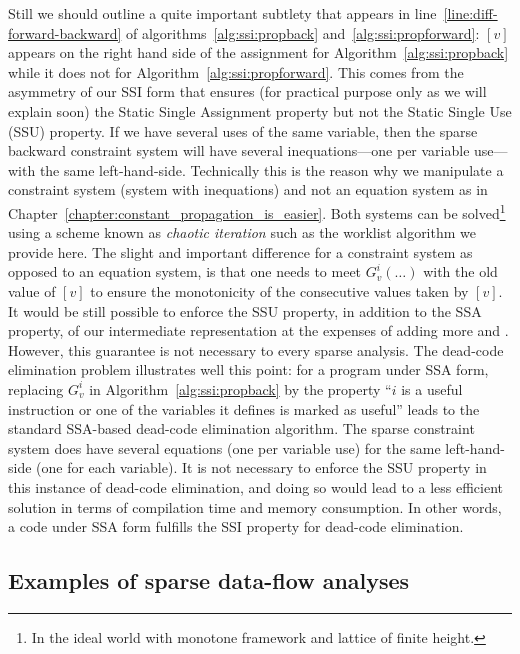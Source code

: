 {Still we should outline a quite important subtlety that appears in 
line~\ref{line:diff-forward-backward} of algorithms~\ref{alg:ssi:propback} 
and~\ref{alg:ssi:propforward}: $[v]$ appears on the right hand side of the 
assignment for Algorithm~\ref{alg:ssi:propback} while it does not for 
Algorithm~\ref{alg:ssi:propforward}. This comes from the asymmetry of our SSI 
form that ensures (for practical purpose only as we will explain soon) the 
Static Single Assignment property but not the Static Single Use (SSU) property.
If we have several uses of the same variable, then the sparse backward 
constraint system will have several inequations---one per variable use---with 
the same left-hand-side.
Technically this is the reason why we manipulate a constraint system (system 
with inequations) and not an equation system as in 
Chapter~\ref{chapter:constant_propagation_is_easier}. Both systems can be 
solved\footnote{In the ideal world with monotone framework and lattice of 
finite height.} using a scheme known as \emph{chaotic iteration} such as the worklist algorithm we provide here. The slight and 
important difference for a constraint system as opposed to an equation system, 
is that one needs to meet $G_v^i(\dots)$ with the old value of $[v]$ to ensure 
the monotonicity of the consecutive values taken by $[v]$.
It would be still possible to enforce the SSU property, in addition to the SSA property, of our intermediate representation at the expenses of adding more \phifuns and \sigmafuns.
However, this guarantee is not necessary to every sparse analysis.
The dead-code elimination problem illustrates well this point:
for a program under SSA form, replacing $G_v^i$ in 
Algorithm~\ref{alg:ssi:propback} by the property ``$i$ is a useful instruction 
or one of the variables it defines is marked as useful'' leads to the standard 
SSA-based dead-code elimination algorithm.
The sparse constraint system does have several equations (one per variable use) for the same left-hand-side (one for each variable).
It is not necessary to enforce the SSU property in this instance of dead-code 
elimination, and doing so would lead to a less efficient solution in terms of 
compilation time and memory consumption.
In other words, a code under SSA form fulfills the SSI property for dead-code elimination.

\subsection{Examples of sparse data-flow analyses}
\label{sub:ssi:examples}

}
